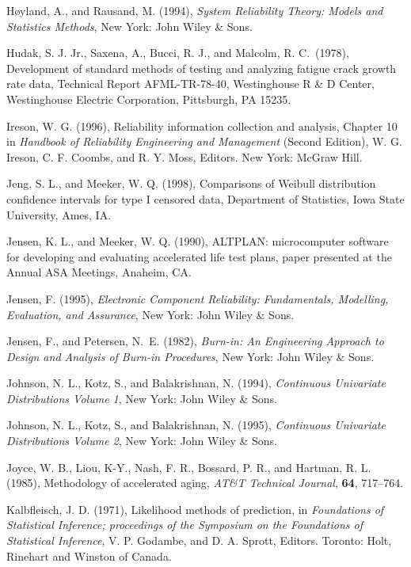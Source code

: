 \begin{thebibliography}{999}
H\o yland, A., and Rausand, M. (1994), {\em System Reliability Theory:
Models and Statistics Methods}, New York: John Wiley \& Sons.

Hudak, S. J. Jr.,  Saxena, A., Bucci, R. J., and Malcolm, R. C.\ (1978),
Development of standard methods of testing and analyzing fatigue
crack growth rate data, Technical Report AFML-TR-78-40, Westinghouse
R \& D Center, Westinghouse Electric Corporation, Pittsburgh,
PA 15235.

Ireson, W. G. (1996), Reliability information collection and analysis,
Chapter 10 in {\em Handbook of Reliability Engineering and
Management} (Second Edition), W. G. Ireson, C. F. Coombs, and R. Y.
Moss, Editors.  New York: McGraw Hill.


Jeng, S. L., and Meeker, W. Q. (1998), Comparisons of Weibull
distribution confidence intervals for type I censored data, Department
of Statistics, Iowa State University, Ames, IA.


Jensen, K. L., and Meeker, W. Q. (1990), ALTPLAN: microcomputer
software for developing and evaluating accelerated life test plans,
paper presented at the Annual ASA Meetings, Anaheim, CA.

Jensen, F. (1995), {\em Electronic Component Reliability:
Fundamentals, Modelling, Evaluation, and Assurance}, New York: John
Wiley \& Sons.

Jensen, F., and Petersen, N.~E. (1982), {\em Burn-in: An Engineering
Approach to Design and Analysis of Burn-in Procedures}, New York: John
Wiley \& Sons.

Johnson, N. L., Kotz, S., and Balakrishnan, N. (1994), {\em
Continuous Univariate Distributions Volume 1}, New York: John Wiley
\& Sons.

Johnson, N. L., Kotz, S., and Balakrishnan, N.  (1995), {\em
Continuous Univariate Distributions Volume 2}, New York: John Wiley
\& Sons.

Joyce, W. B., Liou, K-Y., Nash, F. R., Bossard, P. R., and Hartman,
R.  L. (1985), Methodology of accelerated aging, {\em AT\&T
Technical Journal}, {\bf 64}, 717--764.

Kalbfleisch, J. D. (1971), Likelihood methods of prediction,  in {\em
Foundations of Statistical Inference; proceedings of the Symposium on
the Foundations of Statistical Inference}, V. P. Godambe,  and
 D. A. Sprott, Editors. Toronto: Holt, Rinehart and Winston of Canada.


\end{thebibliography}

